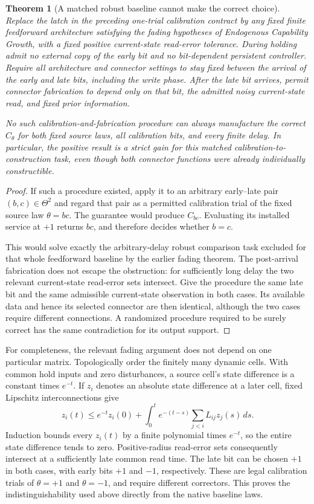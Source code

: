 \documentclass[11pt]{article}
\newtheorem{theorem}{Theorem}[section]
\theoremstyle{definition}
\theoremstyle{remark}
\begin{document}
\begin{theorem}[A matched robust baseline cannot make the correct choice]
\label{arc:thm:corrector-obstruction}
Replace the latch in the preceding one-trial calibration contract by any
fixed finite feedforward architecture satisfying the fading hypotheses
of \emph{Endogenous Capability Growth}, with a fixed positive
current-state read-error tolerance. During holding admit no external copy
of the early bit and no bit-dependent persistent controller. Require all
architecture and connector settings to stay fixed between the arrival
of the early and late bits, including the write phase. After the late bit
arrives, permit
connector fabrication to depend only on that bit, the admitted noisy
current-state read, and fixed prior information.

No such calibration-and-fabrication procedure can always manufacture the
correct $C_\theta$ for both fixed source laws, all calibration bits, and
every finite delay. In particular, the positive result is a strict gain
for this matched calibration-to-construction task, even though both
connector functions were already individually constructible.
\end{theorem}
\begin{proof}
If such a procedure existed, apply it to an arbitrary early--late pair
$(b,c)\in\Theta^2$ and regard that pair as a permitted calibration trial
of the fixed source law $\theta=bc$. The guarantee would produce
$C_{bc}$. Evaluating its installed service at $+1$ returns $bc$, and
therefore decides whether $b=c$.

This would solve exactly the arbitrary-delay robust comparison task
excluded for that whole feedforward baseline by the earlier fading
theorem. The post-arrival fabrication does not escape the obstruction:
for sufficiently long delay the two relevant current-state read-error
sets intersect. Give the procedure the same late bit and the same
admissible current-state observation in both cases. Its available data
and hence its selected connector are then identical, although the two
cases require different connections. A randomized procedure required
to be surely correct has the same contradiction for its output support.
\end{proof}

For completeness, the relevant fading argument does not depend on one
particular matrix. Topologically order the finitely many dynamic cells.
With common hold inputs and zero disturbances, a source cell's state
difference is a constant times $e^{-t}$. If $z_i$ denotes an absolute
state difference at a later cell, fixed Lipschitz interconnections give
\[
 z_i(t)\leq e^{-t}z_i(0)+
   \int_0^t e^{-(t-s)}\sum_{j<i}L_{ij}z_j(s)\,ds.
\]
Induction bounds every $z_i(t)$ by a finite polynomial times $e^{-t}$,
so the entire state difference tends to zero. Positive-radius read-error
sets consequently intersect at a sufficiently late common read time.
The late bit can be chosen $+1$ in both cases, with early bits $+1$ and
$-1$, respectively. These are legal calibration trials of $\theta=+1$
and $\theta=-1$, and require different correctors. This proves the
indistinguishability used above directly from the native baseline laws.
\end{document}
